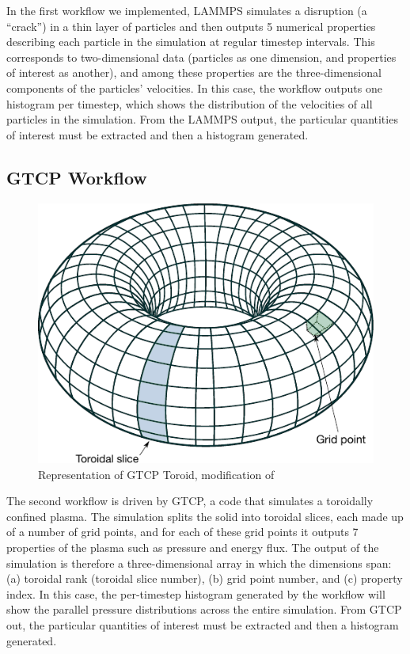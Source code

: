 \documentclass[conference]{IEEEtran}
\begin{document}
In the first workflow we implemented, LAMMPS simulates a disruption (a ``crack'')
in a thin layer of particles and then outputs 5 numerical properties describing
each particle in the simulation at regular timestep intervals. This
corresponds to two-dimensional data (particles as one dimension, and properties
of interest as another), and among these properties are the
three-dimensional components of the particles' velocities. In this case, the
workflow outputs one histogram per timestep, which shows the distribution of the
velocities of all particles in the simulation.  From the LAMMPS output, the particular
quantities of interest must be extracted and then a histogram generated.

\subsection{GTCP Workflow}

\begin{figure}
  \includegraphics[width=\columnwidth]{fig/Simple_Torus_mod}
  \caption{Representation of GTCP Toroid, modification of \cite{WikimediaCommons:torus}}
  \label{fig:lammps-workflow}
\end{figure}

The second workflow is driven by GTCP, a code that simulates a toroidally
confined plasma. The simulation splits the solid into toroidal slices, each
made up of a number of grid points, and for each of these grid points it outputs 7
properties of the plasma such as pressure and energy flux. The output of the
simulation is therefore a three-dimensional array in which the dimensions
span: (a) toroidal rank (toroidal slice number), (b) grid point number,
and (c) property index. In this case, the per-timestep histogram
generated by the workflow will show the parallel pressure distributions across the entire
simulation. From GTCP out, the particular quantities of interest must be
extracted and then a histogram generated.
\end{document}
